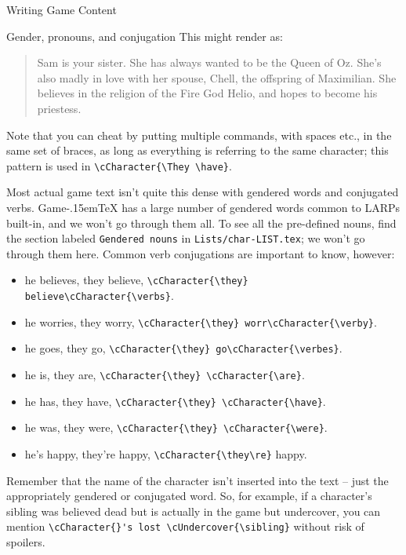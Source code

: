 \documentclass[11pt]{article}
\def\gametex{\mbox{Game\kern-.15em\TeX}}
\newcommand{\pronounfile}{\lstinline|Lists/char-LIST.tex|}
\begin{document}
\begin{section}{Writing Game Content}
\begin{subsection}{Gender, pronouns, and conjugation}
This might render as:

\begin{quote}
Sam is your sister.  She has always wanted to be the Queen of Oz.  She's also madly in love with her spouse, Chell, the offspring of Maximilian.  She believes in the religion of the Fire God Helio, and hopes to become his priestess.
\end{quote}

Note that you can cheat by putting multiple commands, with spaces etc., in the same set of braces, as long as everything is referring to the same character; this pattern is used in \lstinline|\cCharacter{\They \have}|.

Most actual game text isn't quite this dense with gendered words and conjugated verbs.  \gametex{} has a large number of gendered words common to LARPs built-in, and we won't go through them all.
To see all the pre-defined nouns, find the section labeled \texttt{Gendered nouns} in \pronounfile{}; we won't go through them here.  Common verb conjugations are important to know, however:

\begin{itemize}
\item he believes, they believe, \lstinline|\cCharacter{\they} believe\cCharacter{\verbs}|.
\item he worries, they worry, \lstinline|\cCharacter{\they} worr\cCharacter{\verby}|.
\item he goes, they go, \lstinline|\cCharacter{\they} go\cCharacter{\verbes}|.
\item he is, they are, \lstinline|\cCharacter{\they} \cCharacter{\are}|.
\item he has, they have, \lstinline|\cCharacter{\they} \cCharacter{\have}|.
\item he was, they were, \lstinline|\cCharacter{\they} \cCharacter{\were}|.
\item he's happy, they're happy, \lstinline|\cCharacter{\they\re}| happy.
\end{itemize}

Remember that the name of the character isn't inserted into the text – just the appropriately gendered or conjugated word.  So, for example, if a character's sibling was believed dead but is actually in the game but undercover, you can mention \lstinline|\cCharacter{}'s lost \cUndercover{\sibling}| without risk of spoilers.


\end{subsection}
\end{section}
\end{document}

